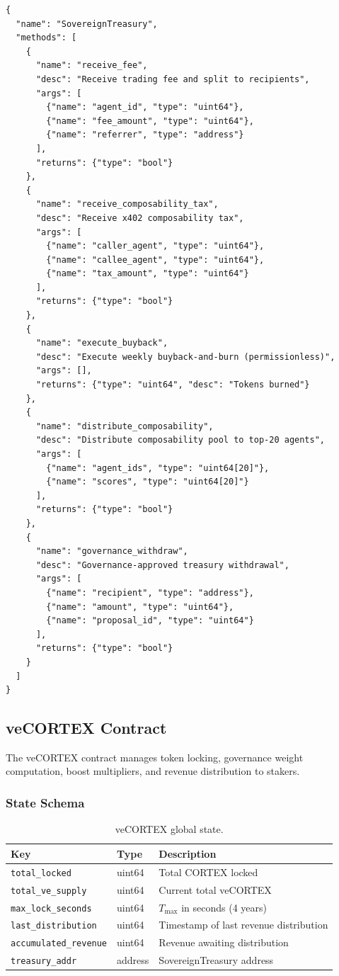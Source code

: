\begin{verbatim}
{
  "name": "SovereignTreasury",
  "methods": [
    {
      "name": "receive_fee",
      "desc": "Receive trading fee and split to recipients",
      "args": [
        {"name": "agent_id", "type": "uint64"},
        {"name": "fee_amount", "type": "uint64"},
        {"name": "referrer", "type": "address"}
      ],
      "returns": {"type": "bool"}
    },
    {
      "name": "receive_composability_tax",
      "desc": "Receive x402 composability tax",
      "args": [
        {"name": "caller_agent", "type": "uint64"},
        {"name": "callee_agent", "type": "uint64"},
        {"name": "tax_amount", "type": "uint64"}
      ],
      "returns": {"type": "bool"}
    },
    {
      "name": "execute_buyback",
      "desc": "Execute weekly buyback-and-burn (permissionless)",
      "args": [],
      "returns": {"type": "uint64", "desc": "Tokens burned"}
    },
    {
      "name": "distribute_composability",
      "desc": "Distribute composability pool to top-20 agents",
      "args": [
        {"name": "agent_ids", "type": "uint64[20]"},
        {"name": "scores", "type": "uint64[20]"}
      ],
      "returns": {"type": "bool"}
    },
    {
      "name": "governance_withdraw",
      "desc": "Governance-approved treasury withdrawal",
      "args": [
        {"name": "recipient", "type": "address"},
        {"name": "amount", "type": "uint64"},
        {"name": "proposal_id", "type": "uint64"}
      ],
      "returns": {"type": "bool"}
    }
  ]
}
\end{verbatim}

\subsection{veCORTEX Contract}
\label{subsec:abi-ve}

The veCORTEX contract manages token locking, governance weight computation,
boost multipliers, and revenue distribution to stakers.

\subsubsection{State Schema}

\begin{table}[H]
\centering
\caption{veCORTEX global state.}
\label{tab:ve-global}
\begin{tabular}{@{}llp{6cm}@{}}
\toprule
\textbf{Key} & \textbf{Type} & \textbf{Description} \\
\midrule
\texttt{total\_locked} & uint64 & Total CORTEX locked \\
\texttt{total\_ve\_supply} & uint64 & Current total veCORTEX \\
\texttt{max\_lock\_seconds} & uint64 & $T_{\max}$ in seconds (4 years) \\
\texttt{last\_distribution} & uint64 & Timestamp of last revenue distribution \\
\texttt{accumulated\_revenue} & uint64 & Revenue awaiting distribution \\
\texttt{treasury\_addr} & address & SovereignTreasury address \\
\bottomrule
\end{tabular}
\end{table}

